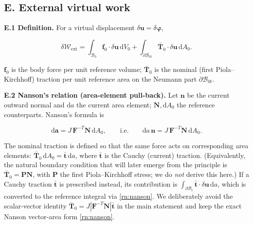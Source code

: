 \documentclass[11pt]{article}
\begin{document}
\subsection{E. External virtual work}

\textbf{E.1 Definition.} For a virtual displacement $\delta\mathbf{u}=\delta\boldsymbol{\varphi}$,

\begin{equation}
\delta\mathcal{W}_{\mathrm{ext}}
= \int_{\mathcal{B}_{0}}
    \mathbf{f}_{0}\cdot\delta\mathbf{u}\,\mathrm{d}V_{0}
+ \int_{\partial\mathcal{B}_{0t}}
    \bar{\mathbf{T}}_{0}\cdot\delta\mathbf{u}\,\mathrm{d}A_{0}.
\label{rn:Wext}
\end{equation}

$\mathbf{f}_{0}$ is the body force per unit reference volume; $\bar{\mathbf{T}}_{0}$ is the nominal (first Piola--Kirchhoff) traction per unit reference area on the Neumann part $\partial\mathcal{B}_{0t}$.

\textbf{E.2 Nanson's relation (area-element pull-back).} Let $\mathbf{n}$ be the current outward normal and $\mathrm{d}a$ the current area element; $\mathbf{N},\mathrm{d}A_{0}$ the reference counterparts. Nanson's formula \cite{Holzapfel2000,BonetWood2008} is

\begin{equation}
\mathrm{d}\mathbf{a}=J\,\mathbf{F}^{-T}\mathbf{N}\,\mathrm{d}A_{0},
\qquad\text{i.e.}\qquad
\mathrm{d}a\,\mathbf{n}=J\,\mathbf{F}^{-T}\mathbf{N}\,\mathrm{d}A_{0}.
\label{rn:nanson}
\end{equation}

The nominal traction is defined so that the same force acts on corresponding area elements:
$\bar{\mathbf{T}}_{0}\,\mathrm{d}A_{0}=\bar{\mathbf{t}}\,\mathrm{d}a$,
where $\bar{\mathbf{t}}$ is the Cauchy (current) traction. (Equivalently, the natural boundary condition that will later emerge from the principle is $\bar{\mathbf{T}}_{0}=\mathbf{P}\mathbf{N}$, with $\mathbf{P}$ the first Piola--Kirchhoff stress; we do \emph{not} derive this here.) If a Cauchy traction $\bar{\mathbf{t}}$ is prescribed instead, its contribution is $\int_{\partial\mathcal{B}_{t}}\bar{\mathbf{t}}\cdot\delta\mathbf{u}\,\mathrm{d}a$, which is converted to the reference integral via \eqref{rn:nanson}. We deliberately avoid the scalar-vector identity $\bar{\mathbf{T}}_{0}=J|\mathbf{F}^{-T}\mathbf{N}|\bar{\mathbf{t}}$ in the main statement and keep the exact Nanson vector-area form \eqref{rn:nanson}.
\end{document}
